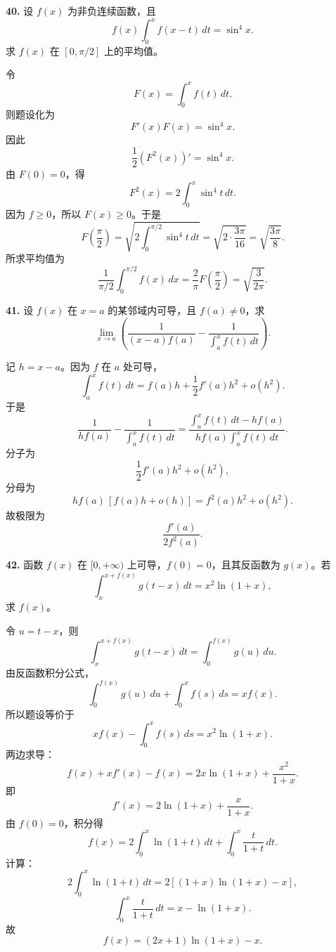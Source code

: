 \begin{problemblock}
\textbf{40.} 设 \(f(x)\) 为非负连续函数，且
\[
f(x)\int_0^x f(x-t)\,dt=\sin^4x.
\]
求 \(f(x)\) 在 \([0,\pi/2]\) 上的平均值。
\end{problemblock}

\begin{solutionblock}
令
\[
F(x)=\int_0^x f(t)\,dt.
\]
则题设化为
\[
F'(x)F(x)=\sin^4x.
\]
因此
\[
\frac12(F^2(x))'=\sin^4x.
\]
由 \(F(0)=0\)，得
\[
F^2(x)=2\int_0^x\sin^4t\,dt.
\]
因为 \(f\ge0\)，所以 \(F(x)\ge0\)。于是
\[
F\left(\frac{\pi}{2}\right)
=\sqrt{2\int_0^{\pi/2}\sin^4t\,dt}
=\sqrt{2\cdot\frac{3\pi}{16}}
=\sqrt{\frac{3\pi}{8}}.
\]
所求平均值为
\[
\frac{1}{\pi/2}\int_0^{\pi/2}f(x)\,dx
=\frac{2}{\pi}F\left(\frac{\pi}{2}\right)
=\boxed{\sqrt{\frac{3}{2\pi}}}.
\]
\end{solutionblock}

\begin{problemblock}
\textbf{41.} 设 \(f(x)\) 在 \(x=a\) 的某邻域内可导，且 \(f(a)\ne0\)，求
\[
\lim_{x\to a}\left(
\frac{1}{(x-a)f(a)}
-\frac{1}{\displaystyle\int_a^x f(t)\,dt}
\right).
\]
\end{problemblock}

\begin{solutionblock}
记 \(h=x-a\)。因为 \(f\) 在 \(a\) 处可导，
\[
\int_a^x f(t)\,dt
=f(a)h+\frac12f'(a)h^2+o(h^2).
\]
于是
\[
\frac{1}{hf(a)}
-\frac{1}{\int_a^x f(t)\,dt}
=
\frac{\int_a^x f(t)\,dt-hf(a)}
{hf(a)\int_a^x f(t)\,dt}.
\]
分子为
\[
\frac12f'(a)h^2+o(h^2),
\]
分母为
\[
h f(a)\,[f(a)h+o(h)]=f^2(a)h^2+o(h^2).
\]
故极限为
\[
\boxed{\frac{f'(a)}{2f^2(a)}}.
\]
\end{solutionblock}

\begin{problemblock}
\textbf{42.} 函数 \(f(x)\) 在 \([0,+\infty)\) 上可导，\(f(0)=0\)，且其反函数为 \(g(x)\)。若
\[
\int_x^{x+f(x)}g(t-x)\,dt=x^2\ln(1+x),
\]
求 \(f(x)\)。
\end{problemblock}

\begin{solutionblock}
令 \(u=t-x\)，则
\[
\int_x^{x+f(x)}g(t-x)\,dt
=\int_0^{f(x)}g(u)\,du.
\]
由反函数积分公式，
\[
\int_0^{f(x)}g(u)\,du+\int_0^x f(s)\,ds=xf(x).
\]
所以题设等价于
\[
xf(x)-\int_0^x f(s)\,ds=x^2\ln(1+x).
\]
两边求导：
\[
f(x)+xf'(x)-f(x)=2x\ln(1+x)+\frac{x^2}{1+x}.
\]
即
\[
f'(x)=2\ln(1+x)+\frac{x}{1+x}.
\]
由 \(f(0)=0\)，积分得
\[
f(x)=2\int_0^x\ln(1+t)\,dt+\int_0^x\frac{t}{1+t}\,dt.
\]
计算：
\[
2\int_0^x\ln(1+t)\,dt
=2[(1+x)\ln(1+x)-x],
\]
\[
\int_0^x\frac{t}{1+t}\,dt=x-\ln(1+x).
\]
故
\[
\boxed{f(x)=(2x+1)\ln(1+x)-x}.
\]
\end{solutionblock}

